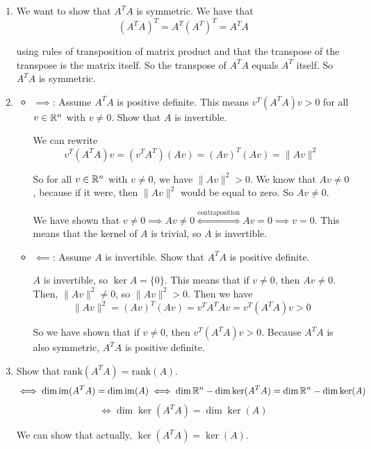 \documentclass[12pt]{article}
\begin{document}
\begin{enumerate}[label=\alph*)]
    \item We want to show that $A^TA$ is symmetric. We have that
    $$
        (A^TA)^T = A^T (A^T)^T = A^T A
    $$

    using rules of transposition of matrix product and that the transpose of the transpose is the matrix itself. So the transpose of $A^TA$ equals $A^T$ itself. So $A^TA$ is symmetric.

    \item 
    \begin{itemize}
        \item \underline{$\implies$}: Assume $A^TA$ is positive definite. This means $v^T (A^T A) v > 0$ for all $v \in \mathbb{R}^n$ with $v \neq 0$. Show that $A$ is invertible.
        
        We can rewrite
        $$
            v^T (A^T A) v = (v^T A^T) (A v) = (Av)^T (Av) = \lVert A v \rVert^2
        $$

        So for all $v \in \mathbb{R}^n$ with $v \neq 0$, we have $\lVert Av \rVert^2 > 0$. We know that $Av \neq 0$, because if it were, then $\lVert Av \rVert^2$ would be equal to zero. So $Av \neq 0$.

        We have shown that $v \neq 0 \implies Av \neq 0 \overset{\text{contraposition}}{\iff} Av = 0 \implies v = 0$. This means that the kernel of $A$ is trivial, so $A$ is invertible.

        \item \underline{$\impliedby$}: Assume $A$ is invertible. Show that $A^TA$ is positive definite.
        
        $A$ is invertible, so $\ker A = \{0\}$. This means that if $v \neq 0$, then $A v \neq 0$. Then, $\lVert A v \rVert^2 \neq 0$, so $\lVert A v \rVert^2 > 0$. Then we have
        $$
            \lVert Av \rVert^2 = (Av)^T (Av) = v^T A^T A v = v^T (A^TA) v > 0
        $$

        So we have shown that if $v \neq 0$, then $v^T (A^TA) v > 0$. Because $A^T A$ is also symmetric, $A^TA$ is positive definite.
    \end{itemize}

    \item Show that $\mathrm{rank}(A^T A) = \mathrm{rank}(A)$.
    $$
        \iff \dim\operatorname{im}(A^T A) = \dim\operatorname{im}(A) \iff \dim\mathbb{R}^n - \dim\ker(A^T A) = \dim\mathbb{R}^n - \dim\ker(A)
    $$
    $$
        \iff \dim\ker(A^T A) = \dim\ker(A)
    $$

    We can show that actually, $\ker(A^T A) = \ker(A)$.


\end{enumerate}
\end{document}
